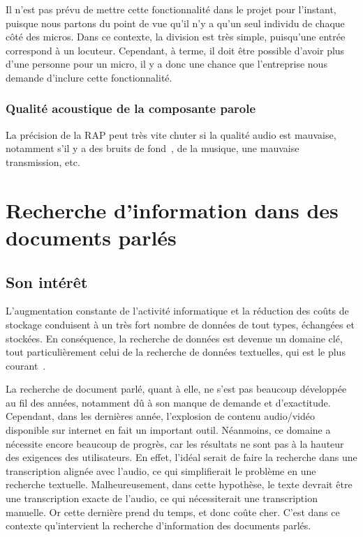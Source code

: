 	Il n'est pas prévu de mettre cette fonctionnalité dans le projet pour l'instant, puisque nous partons du point de vue qu'il n'y a qu'un seul individu de chaque côté des micros. Dans ce contexte, la division est très simple, puisqu'une entrée correspond à un locuteur. Cependant, à terme, il doit être possible d'avoir plus d'une personne pour un micro, il y a donc une chance que l'entreprise nous demande d'inclure cette fonctionnalité.
	
	\subsection{Qualité acoustique de la composante parole}
	La précision de la RAP peut très vite chuter si la qualité audio est mauvaise, notamment s'il y a des bruits de fond~\cite{noisy-speech-recognition}, de la musique, une mauvaise transmission, etc.
	
	
	
	
	\chapter{Recherche d'information dans des documents parlés}
	\section{Son intérêt}
	L'augmentation constante de l'activité informatique et la réduction des coûts de stockage conduisent à un très fort nombre de données de tout types, échangées et stockées. En conséquence, la recherche de données est devenue un domaine clé, tout particulièrement celui de la recherche de données textuelles, qui est le plus courant~\cite{retrieval-browsing-spoken-content}.
	
	La recherche de document parlé, quant à elle, ne s'est pas beaucoup développée au fil des années, notamment dû à son manque de demande et d'exactitude. Cependant, dans les dernières année, l'explosion de contenu audio/vidéo disponible sur internet en fait un important outil. Néanmoins, ce domaine a nécessite encore beaucoup de progrès, car les résultats ne sont pas à la hauteur des exigences des utilisateurs. En effet, l'idéal serait de faire la recherche dans une transcription alignée avec l'audio, ce qui simplifierait le problème en une recherche textuelle. Malheureusement, dans cette hypothèse, le texte devrait être une transcription exacte de l'audio, ce qui nécessiterait une transcription manuelle. Or cette dernière prend du temps, et donc coûte cher. C'est dans ce contexte qu'intervient la recherche d'information des documents parlés.
	
